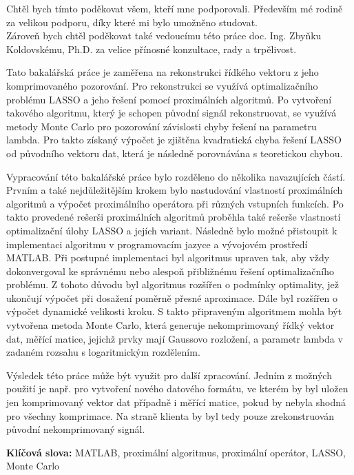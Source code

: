 \documentclass[FM,BP]{tulthesis}
\begin{document}
\begin{acknowledgement}
Chtěl bych tímto poděkovat všem, kteří mne podporovali. Především mé rodině za velikou podporu, díky které mi bylo umožněno studovat. \\ Zároveň bych chtěl poděkovat také vedoucímu této práce doc. Ing. Zbyňku Koldovskému, Ph.D. za velice přínosné konzultace, rady a trpělivost.
\end{acknowledgement}
\clearpage
\begin{abstractCZ}
Tato bakalářská práce je zaměřena na rekonstrukci řídkého vektoru z jeho komprimovaného pozorování. Pro rekonstrukci se využívá optimalizačního problému LASSO a jeho řešení pomocí proximálních algoritmů. Po vytvoření takového algoritmu, který je schopen původní signál rekonstruovat, se využívá metody Monte Carlo pro pozorování závislosti chyby řešení na parametru lambda. Pro takto získaný výpočet je zjištěna kvadratická chyba řešení LASSO od původního vektoru dat, která je následně porovnávána s teoretickou chybou.


Vypracování této bakalářské práce bylo rozděleno do několika navazujících částí. Prvním a také nejdůležitějším krokem bylo nastudování vlastností proximálních algoritmů a výpočet proximálního operátora při různých vstupních funkcích. Po takto provedené rešerši proximálních algoritmů proběhla také rešerše vlastností optimalizační úlohy LASSO a jejích variant. Následně bylo možné přistoupit k implementaci algoritmu v programovacím jazyce a vývojovém prostředí MATLAB. Při postupné implementaci byl algoritmus upraven tak, aby vždy dokonvergoval ke správnému nebo alespoň přibližnému řešení optimalizačního problému. Z tohoto důvodu byl algoritmus rozšířen o podmínky optimality, jež ukončují výpočet při dosažení poměrně přesné aproximace. Dále byl rozšířen o výpočet dynamické velikosti kroku. S takto připraveným algoritmem mohla být vytvořena metoda Monte Carlo, která generuje nekomprimovaný řídký vektor dat, měřící matice, jejichž prvky mají Gaussovo rozložení, a parametr lambda v zadaném rozsahu s logaritmickým rozdělením.    


Výsledek této práce může být využit pro další zpracování. Jedním z možných použití je např. pro vytvoření nového datového formátu, ve kterém by byl uložen jen komprimovaný vektor dat případně i měřící matice, pokud by nebyla shodná pro všechny komprimace. Na straně klienta by byl tedy pouze zrekonstruován původní nekomprimovaný signál.


\textbf{Klíčová slova:} MATLAB, proximální algoritmus, proximální operátor, LASSO, Monte Carlo
\end{abstractCZ}
\end{document}
